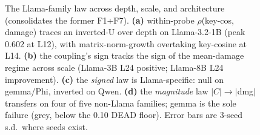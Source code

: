 \begin{figure}[t]
\centering

\caption{The Llama-family law across depth, scale, and architecture (consolidates
the former F1+F7). \textbf{(a)} within-probe $\rho$(key-cos, damage) traces an
inverted-U over depth on Llama-3.2-1B (peak $0.602$ at L12), with matrix-norm-growth
overtaking key-cosine at L14. \textbf{(b)} the coupling's sign tracks the sign of the
mean-damage regime across scale (Llama-3B L24 positive; Llama-8B L24 improvement).
\textbf{(c)} the \emph{signed} law is Llama-specific: null on gemma/Phi, inverted on
Qwen. \textbf{(d)} the \emph{magnitude} law $|C|\!\to\!|$dmg$|$ transfers on four of five
non-Llama families; gemma is the sole failure (grey, below the 0.10 DEAD floor).
Error bars are 3-seed s.d.\ where seeds exist.}
\label{fig:layerlaw}
\label{fig:crossarch}
\end{figure}
